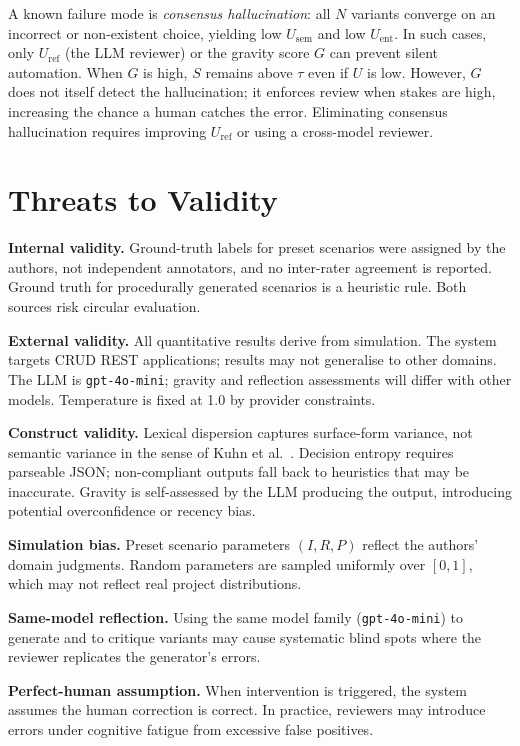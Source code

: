 \documentclass[conference]{IEEEtran}
\newcommand{\Usem}{U_{\mathrm{sem}}}
\newcommand{\Uent}{U_{\mathrm{ent}}}
\newcommand{\Uref}{U_{\mathrm{ref}}}
\begin{document}
A known failure mode is \emph{consensus hallucination}: all $N$ variants
converge on an incorrect or non-existent choice, yielding low $\Usem$ and
low $\Uent$.
In such cases, only $\Uref$ (the LLM reviewer) or the gravity score $G$
can prevent silent automation.
When $G$ is high, $S$ remains above $\tau$ even if $U$ is low.
However, $G$ does not itself detect the hallucination; it enforces review
when stakes are high, increasing the chance a human catches the error.
Eliminating consensus hallucination requires improving $\Uref$ or using
a cross-model reviewer.

\section{Threats to Validity}\label{sec:threats}

\textbf{Internal validity.}
Ground-truth labels for preset scenarios were assigned by the authors, not
independent annotators, and no inter-rater agreement is reported.
Ground truth for procedurally generated scenarios is a heuristic rule.
Both sources risk circular evaluation.

\textbf{External validity.}
All quantitative results derive from simulation.
The system targets CRUD REST applications; results may not generalise to
other domains.
The LLM is \texttt{gpt-4o-mini}; gravity and reflection assessments will
differ with other models.
Temperature is fixed at 1.0 by provider constraints.

\textbf{Construct validity.}
Lexical dispersion captures surface-form variance, not semantic variance
in the sense of Kuhn et al.~\cite{kuhn2023semantic}.
Decision entropy requires parseable JSON; non-compliant outputs fall back
to heuristics that may be inaccurate.
Gravity is self-assessed by the LLM producing the output, introducing
potential overconfidence or recency bias.

\textbf{Simulation bias.}
Preset scenario parameters $(I,R,P)$ reflect the authors' domain judgments.
Random parameters are sampled uniformly over $[0,1]$, which may not reflect
real project distributions.

\textbf{Same-model reflection.}
Using the same model family (\texttt{gpt-4o-mini}) to generate and to
critique variants may cause systematic blind spots where the reviewer
replicates the generator's errors.

\textbf{Perfect-human assumption.}
When intervention is triggered, the system assumes the human correction is
correct.
In practice, reviewers may introduce errors under cognitive fatigue from
excessive false positives.
\end{document}
